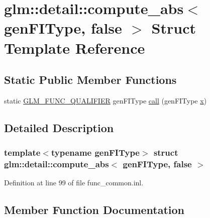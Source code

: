 \hypertarget{structglm_1_1detail_1_1compute__abs_3_01gen_f_i_type_00_01false_01_4}{}\section{glm\+::detail\+::compute\+\_\+abs$<$ gen\+F\+I\+Type, false $>$ Struct Template Reference}
\label{structglm_1_1detail_1_1compute__abs_3_01gen_f_i_type_00_01false_01_4}
\subsection*{Static Public Member Functions}
\begin{DoxyCompactItemize}
\item 
static \mbox{\hyperlink{setup_8hpp_a33fdea6f91c5f834105f7415e2a64407}{G\+L\+M\+\_\+\+F\+U\+N\+C\+\_\+\+Q\+U\+A\+L\+I\+F\+I\+ER}} gen\+F\+I\+Type \mbox{\hyperlink{structglm_1_1detail_1_1compute__abs_3_01gen_f_i_type_00_01false_01_4_acc50915fdea0a19f047f019081c56dcc}{call}} (gen\+F\+I\+Type \mbox{\hyperlink{glad_8h_a92d0386e5c19fb81ea88c9f99644ab1d}{x}})
\end{DoxyCompactItemize}


\subsection{Detailed Description}
\subsubsection*{template$<$typename gen\+F\+I\+Type$>$\newline
struct glm\+::detail\+::compute\+\_\+abs$<$ gen\+F\+I\+Type, false $>$}



Definition at line 99 of file func\+\_\+common.\+inl.



\subsection{Member Function Documentation}
\mbox{\label{structglm_1_1detail_1_1compute__abs_3_01gen_f_i_type_00_01false_01_4_acc50915fdea0a19f047f019081c56dcc}} 
